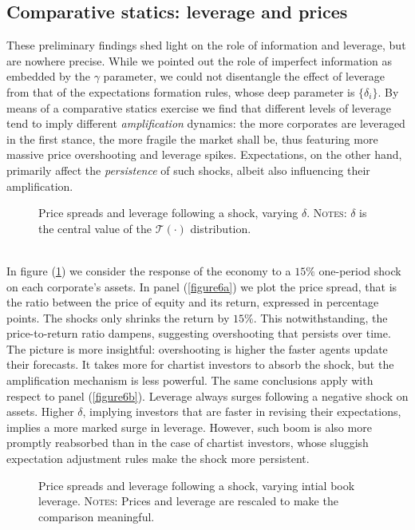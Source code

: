 \documentclass[11pt]{article}
\begin{document}
\subsection{Comparative statics: leverage and prices}
These preliminary findings shed light on the role of information and leverage, but are nowhere precise. While we pointed out the role of imperfect information as embedded by the $\gamma$ parameter, we could not disentangle the effect of leverage from that of the expectations formation rules, whose deep parameter is $\{ \delta_i\}$. By means of a comparative statics exercise we find that different levels of leverage tend to imply different \emph{amplification} dynamics: the more corporates are leveraged in the first stance, the more fragile the market shall be, thus featuring more massive price overshooting and leverage spikes. Expectations, on the other hand, primarily affect the \emph{persistence} of such shocks, albeit also influencing their amplification.
\begin{figure}[h!]
\centering
{}\quad
{}
 \caption{Price spreads and leverage following a shock, varying $\delta$. \textsc{Notes}: $\delta$ is the central value of the $\mathcal{T}(\cdot)$ distribution.} \label{figure6}
\end{figure}\\
In figure (\ref{figure6}) we consider the response of the economy to a $15\%$ one-period shock on each corporate's assets. In panel (\ref{figure6a}) we plot the price spread, that is the ratio between the price of equity and its return, expressed in percentage points. The shocks only shrinks the return by $15\%$. This notwithstanding, the price-to-return ratio dampens, suggesting overshooting that persists over time. The picture is more insightful: overshooting is higher the faster agents update their forecasts. It takes more for chartist investors to absorb the shock, but the amplification mechanism is less powerful. The same conclusions apply with respect to panel (\ref{figure6b}). Leverage always surges following a negative shock on assets. Higher $\delta$, implying investors that are faster in revising their expectations, implies a more marked surge in leverage. However, such boom is also more promptly reabsorbed than in the case of chartist investors, whose sluggish expectation adjustment rules make the shock more persistent.\\ 
\begin{figure}[h!]
\centering
{}\quad
{}
 \caption{Price spreads and leverage following a shock, varying intial book leverage. \textsc{Notes}: Prices and leverage are rescaled to make the comparison meaningful.} \label{figure7}
\end{figure}\\
\end{document}
